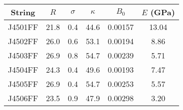 \begin{tabular}{cccccc}
\toprule
String & $R$ & $\sigma$ & $\kappa$ & $B_0$ & $E$ (GPa) \\
\midrule
J4501FF & 21.8 & 0.4 & 44.6 & 0.00157 & 13.04 \\
J4502FF & 26.0 & 0.6 & 53.1 & 0.00194 & 8.86 \\
J4503FF & 26.9 & 0.8 & 54.7 & 0.00239 & 5.71 \\
J4504FF & 24.3 & 0.4 & 49.6 & 0.00193 & 7.47 \\
J4505FF & 26.9 & 0.4 & 54.7 & 0.00253 & 5.57 \\
J4506FF & 23.5 & 0.9 & 47.9 & 0.00298 & 3.20 \\
\bottomrule
\end{tabular}

